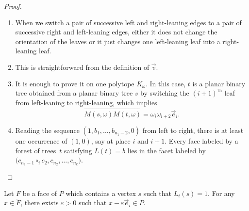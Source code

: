\skpt
\begin{proof}
\begin{enumerate}
\item When we switch a pair of successive left and right-leaning edges to a pair of successive right and left-leaning edges, either it does not change the orientation of the leaves or it just changes one left-leaning leaf into a right-leaning leaf.

\item This is straightforward from the definition of $\vec v$.

\item It is enough to prove it on one polytope $K_\omega$.
In this case, $t$ is a planar binary tree obtained from a planar binary tree $s$ by switching the $(i+1)^\text{th}$ leaf from left-leaning to right-leaning, which implies
\[
\overrightarrow{M(s, \omega)M(t, \omega)}=\omega_i\omega_{i+2}\vec e_i.
\]
\item Reading the sequence $(1, b_1, \ldots, b_{n_1-2}, 0)$ from left to right, there is at least one occurrence of $(1,0)$, say at place $i$ and $i+1$. Every face labeled by a forest of trees~$t$ satisfying $L(t)=b$ lies in the facet labeled by $\big(c_{n_1-1}\circ_i c_2, c_{n_2}, \ldots, c_{n_k}\big)$.\qedhere
\end{enumerate}
\end{proof}

\begin{lemma}\label{lem:FACE}
Let $F$ be a face of $P$ which contains a vertex $s$ such that $L_i(s) = 1$. For any $x\in \mathring F$, there exists $\varepsilon>0$ such that $x- \varepsilon \vec e_i\in P$.
\end{lemma}

